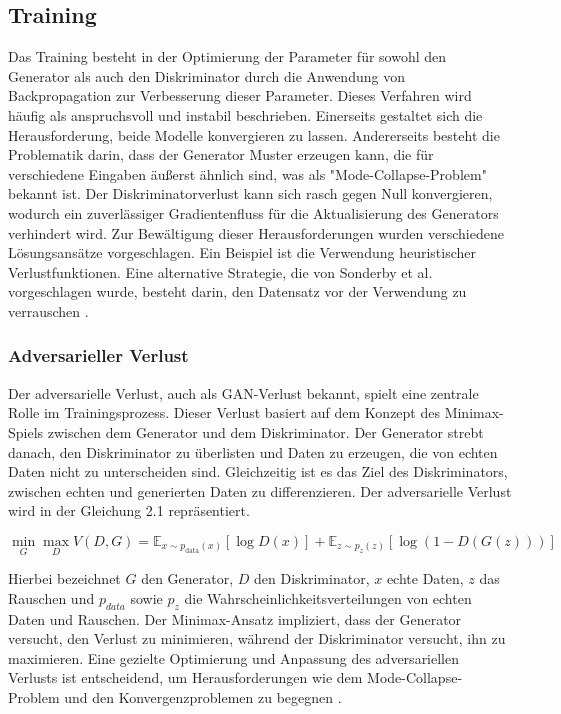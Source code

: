 \subsection{Training}
Das Training besteht in der Optimierung der Parameter für sowohl den Generator als auch den Diskriminator durch die Anwendung von Backpropagation zur Verbesserung dieser Parameter. Dieses Verfahren wird häufig als anspruchsvoll und instabil beschrieben. Einerseits gestaltet sich die Herausforderung, beide Modelle konvergieren zu lassen. Andererseits besteht die Problematik darin, dass der Generator Muster erzeugen kann, die für verschiedene Eingaben äußerst ähnlich sind, was als "Mode-Collapse-Problem" bekannt ist. Der Diskriminatorverlust kann sich rasch gegen Null konvergieren, wodurch ein zuverlässiger Gradientenfluss für die Aktualisierung des Generators verhindert wird.
Zur Bewältigung dieser Herausforderungen wurden verschiedene Lösungsansätze vorgeschlagen. Ein Beispiel ist die Verwendung heuristischer Verlustfunktionen. Eine alternative Strategie, die von Sonderby et al. vorgeschlagen wurde, besteht darin, den Datensatz vor der Verwendung zu verrauschen \cite{Creswell.2018}.

\subsubsection*{Adversarieller Verlust}
Der adversarielle Verlust, auch als GAN-Verlust bekannt, spielt eine zentrale Rolle im Trainingsprozess. Dieser Verlust basiert auf dem Konzept des Minimax-Spiels zwischen dem Generator und dem Diskriminator. Der Generator strebt danach, den Diskriminator zu überlisten und Daten zu erzeugen, die von echten Daten nicht zu unterscheiden sind. Gleichzeitig ist es das Ziel des Diskriminators, zwischen echten und generierten Daten zu differenzieren. Der adversarielle Verlust wird in der Gleichung 2.1 repräsentiert.

\begin{equation}
    \min_G \max_D V(D, G) = \mathbb{E}_{x\sim p_{\text{data}}(x)}[\log D(x)] + \mathbb{E}_{z\sim p_z(z)}[\log(1 - D(G(z)))]
\end{equation}

Hierbei bezeichnet $G$ den Generator, $D$ den Diskriminator, $x$ echte Daten, $z$ das Rauschen und $p_{data}$ sowie $p_z$ die Wahrscheinlichkeitsverteilungen von echten Daten und Rauschen. Der Minimax-Ansatz impliziert, dass der Generator versucht, den Verlust zu minimieren, während der Diskriminator versucht, ihn zu maximieren. Eine gezielte Optimierung und Anpassung des adversariellen Verlusts ist entscheidend, um Herausforderungen wie dem Mode-Collapse-Problem und den Konvergenzproblemen zu begegnen \cite{Hong.2020}.

